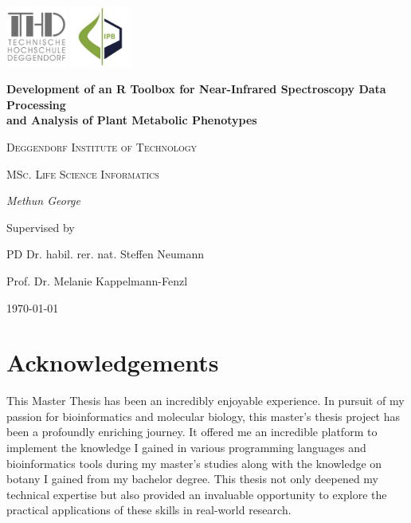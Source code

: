 \documentclass[12pt,a4paper]{report}
\begin{document}
\begin{titlepage}
    \centering
    \begin{flushright}
        \centering
        \includegraphics[width=2cm]{images/thd.png} %
        \hspace{0cm} %
        \includegraphics[width=2cm]{images/ipb.jpg} %
    \end{flushright}
    {\huge\bfseries Development of an R Toolbox for Near-Infrared Spectroscopy Data Processing \\
    and Analysis of Plant Metabolic Phenotypes\par}
    \vspace{2cm}
    {\LARGE \textsc{Deggendorf Institute of Technology}\par}
    \vspace{1cm}
    {\Large \textsc{MSc. Life Science Informatics}\par}
    \vspace{1.5cm}
    {\Large\itshape Methun George\par}
    \vfill
    Supervised by\par
    PD Dr. habil. rer. nat. Steffen Neumann\par
    Prof. Dr. Melanie Kappelmann-Fenzl
    \vfill
    {\large \today\par}
\end{titlepage}

\newpage
\section*{Acknowledgements}
This Master Thesis has been an incredibly enjoyable experience. In pursuit of my passion for bioinformatics and molecular biology, this master’s thesis project has been a profoundly enriching journey. It offered me an incredible platform to implement the knowledge I gained in various programming languages and bioinformatics tools during my master’s studies along with the knowledge on botany I gained from my bachelor degree. This thesis not only deepened my technical expertise but also provided an invaluable opportunity to explore the practical applications of these skills in real-world research. \\
\end{document}
